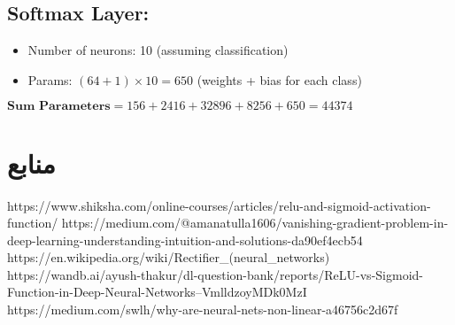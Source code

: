 \documentclass{article}
\begin{document}
\begin{latin}
\subsection*{Softmax Layer:}
\begin{itemize}
    \item Number of neurons: 10 (assuming classification)
    \item Params: $(64 + 1) \times 10 = 650$ (weights + bias for each class)
\end{itemize}

$\textbf{Sum Parameters} = 156 + 2416 + 32896 + 8256 + 650 = 44374$

\end{latin}


\section{}

\section{}

\section{}




\section*{منابع}
\renewcommand{\section}[2]{}%
\begin{thebibliography}{99} %


\begin{LTRitems}

\resetlatinfont

 https://www.shiksha.com/online-courses/articles/relu-and-sigmoid-activation-function/
 https://medium.com/@amanatulla1606/vanishing-gradient-problem-in-deep-learning-understanding-intuition-and-solutions-da90ef4ecb54
 https://en.wikipedia.org/wiki/Rectifier\_(neural\_networks)
 https://wandb.ai/ayush-thakur/dl-question-bank/reports/ReLU-vs-Sigmoid-Function-in-Deep-Neural-Networks--VmlldzoyMDk0MzI
 https://medium.com/swlh/why-are-neural-nets-non-linear-a46756c2d67f
\end{LTRitems}

\end{thebibliography}
\end{document}
